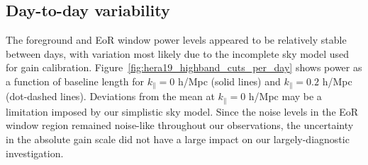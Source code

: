 \subsection{Day-to-day variability}

The foreground and EoR window power levels appeared to be relatively stable between days, with variation most likely due to the incomplete sky model used for gain calibration. Figure~\ref{fig:hera19_highband_cuts_per_day} shows power as a function of baseline length for $k_{\parallel}=0$ h/Mpc (solid lines) and $k_{\parallel}=0.2$ h/Mpc (dot-dashed lines). Deviations from the mean at $k_{\parallel}=0$ h/Mpc may be a limitation imposed by our simplistic sky model. Since the noise levels in the EoR window region remained noise-like throughout our observations, the uncertainty in the absolute gain scale did not have a large impact on our largely-diagnostic investigation.

